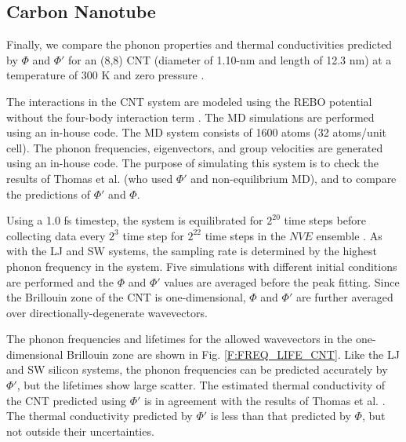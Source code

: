 \subsection{\label{S:Subsection_prop_CNT}Carbon Nanotube}
Finally, we compare the phonon properties and thermal conductivities 
predicted by $\Phi$ and 
$\Phi'$ for an (8,8) CNT (diameter of 1.10-nm and length of 12.3 nm) at 
a temperature of $300$ K 
and zero pressure \cite{thomas_predicting_2010}. 

The interactions in the CNT system 
are modeled using the 
REBO potential without the four-body interaction term 
\cite{brenner_second-generation_2002}. 
The MD simulations are 
performed using an in-house code. The MD system consists of 1600 atoms 
(32 atoms/unit cell). The 
phonon frequencies, eigenvectors, and group velocities are generated using 
an in-house code. The 
purpose of simulating this system is to check the results of Thomas et al.
\cite{thomas_predicting_2010} (who 
used $\Phi'$ and non-equilibrium MD), and to compare the predictions of 
$\Phi'$ and $\Phi$.

Using a 1.0 fs timestep, the system is equilibrated for $2^{20}$ time 
steps before collecting data 
every $2^3$ time step for $2^{22}$ time steps in the $NVE$ ensemble 
\cite{mcquarrie_statistical_2000}. As with 
the LJ and SW systems, the sampling rate is determined by the highest 
phonon frequency in the 
system. Five simulations with different initial conditions are performed 
and the $\Phi$ and $\Phi'$ 
values are averaged before the peak fitting. Since the Brillouin zone of 
the CNT is 
one-dimensional, $\Phi$ and $\Phi'$ are further averaged over 
directionally-degenerate wavevectors.

The phonon frequencies and lifetimes for the allowed wavevectors in the 
one-dimensional Brillouin 
zone are shown in Fig. \ref{F:FREQ_LIFE_CNT}. Like the LJ and SW silicon 
systems, the 
phonon frequencies can be predicted accurately by $\Phi'$, but the 
lifetimes show large scatter. 
The estimated thermal conductivity of the CNT predicted using $\Phi'$ is 
in agreement with the 
results of Thomas et al. \cite{thomas_predicting_2010}. 
The thermal conductivity 
predicted by $\Phi'$ is less 
than that predicted by $\Phi$, but not outside their uncertainties.

